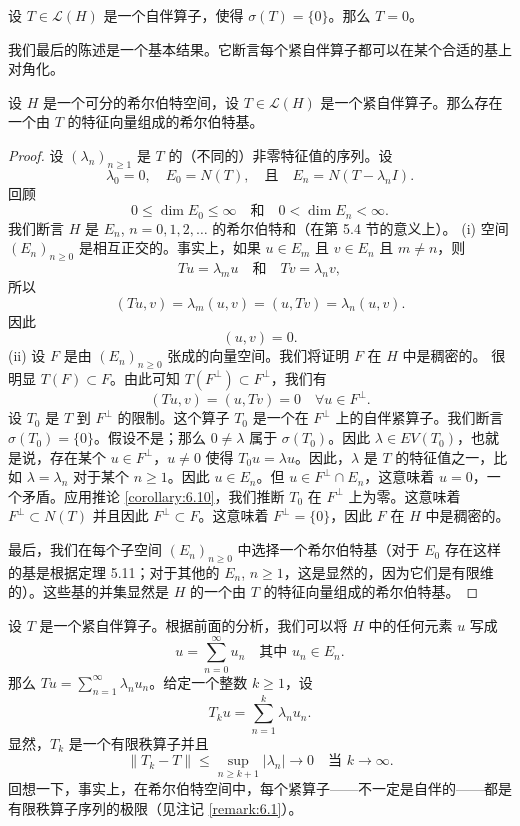 \begin{corollary}\label{corollary:6.10}
设 \(T \in \mathcal{L}(H)\) 是一个自伴算子，使得 \(\sigma(T)=\{0\}\)。那么 \(T=0\)。
\end{corollary}

我们最后的陈述是一个基本结果。它断言每个紧自伴算子都可以在某个合适的基上对角化。

\begin{theorem}\label{theorem:6.11}
设 \(H\) 是一个可分的希尔伯特空间，设 \(T \in \mathcal{L}(H)\) 是一个紧自伴算子。那么存在一个由 \(T\) 的特征向量组成的希尔伯特基。
\end{theorem}

\begin{proof}
设 \((\lambda_n)_{n \ge 1}\) 是 \(T\) 的（不同的）非零特征值的序列。设
\[
\lambda_0 = 0, \quad E_0 = N(T), \quad \text{且} \quad E_n = N(T - \lambda_n I).
\]
回顾
\[
0 \le \dim E_0 \le \infty \quad \text{和} \quad 0 < \dim E_n < \infty.
\]
我们断言 \(H\) 是 \(E_n\), \(n=0, 1, 2, \ldots\) 的希尔伯特和（在第 5.4 节的意义上）。
(i) 空间 \((E_n)_{n \ge 0}\) 是相互正交的。事实上，如果 \(u \in E_m\) 且 \(v \in E_n\) 且 \(m \ne n\)，则
\[
Tu = \lambda_m u \quad \text{和} \quad Tv = \lambda_n v,
\]
所以
\[
(Tu, v) = \lambda_m(u, v) = (u, Tv) = \lambda_n(u,v).
\]
因此
\[
(u,v) = 0.
\]
(ii) 设 \(F\) 是由 \((E_n)_{n \ge 0}\) 张成的向量空间。我们将证明 \(F\) 在 \(H\) 中是稠密的。
很明显 \(T(F) \subset F\)。由此可知 \(T(F^\perp) \subset F^\perp\)，我们有
\[
(Tu, v) = (u, Tv) = 0 \quad \forall u \in F^\perp.
\]
设 \(T_0\) 是 \(T\) 到 \(F^\perp\) 的限制。这个算子 \(T_0\) 是一个在 \(F^\perp\) 上的自伴紧算子。我们断言 \(\sigma(T_0)=\{0\}\)。假设不是；那么 \(0 \ne \lambda\) 属于 \(\sigma(T_0)\)。因此 \(\lambda \in EV(T_0)\)，也就是说，存在某个 \(u \in F^\perp\)，\(u \ne 0\) 使得 \(T_0 u = \lambda u\)。因此，\(\lambda\) 是 \(T\) 的特征值之一，比如 \(\lambda=\lambda_n\) 对于某个 \(n \ge 1\)。因此 \(u \in E_n\)。但 \(u \in F^\perp \cap E_n\)，这意味着 \(u=0\)，一个矛盾。应用推论 \ref{corollary:6.10}，我们推断 \(T_0\) 在 \(F^\perp\) 上为零。这意味着 \(F^\perp \subset N(T)\) 并且因此 \(F^\perp \subset F\)。这意味着 \(F^\perp = \{0\}\)，因此 \(F\) 在 \(H\) 中是稠密的。

最后，我们在每个子空间 \((E_n)_{n \ge 0}\) 中选择一个希尔伯特基（对于 \(E_0\) 存在这样的基是根据定理 5.11；对于其他的 \(E_n\), \(n \ge 1\)，这是显然的，因为它们是有限维的）。这些基的并集显然是 \(H\) 的一个由 \(T\) 的特征向量组成的希尔伯特基。
\end{proof}

\begin{remark}\label{remark:6.8}
设 \(T\) 是一个紧自伴算子。根据前面的分析，我们可以将 \(H\) 中的任何元素 \(u\) 写成
\[
u = \sum_{n=0}^\infty u_n \quad \text{其中 } u_n \in E_n.
\]
那么 \(Tu = \sum_{n=1}^\infty \lambda_n u_n\)。给定一个整数 \(k \ge 1\)，设
\[
T_k u = \sum_{n=1}^k \lambda_n u_n.
\]
显然，\(T_k\) 是一个有限秩算子并且
\[
\|T_k - T\| \le \sup_{n \ge k+1} |\lambda_n| \to 0 \quad \text{当 } k \to \infty.
\]
回想一下，事实上，在希尔伯特空间中，每个紧算子——不一定是自伴的——都是有限秩算子序列的极限（见注记 \ref{remark:6.1}）。
\end{remark}
